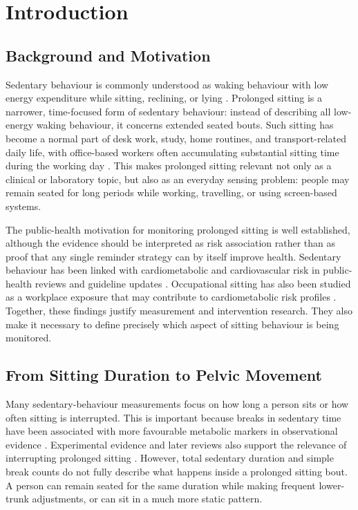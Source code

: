 \chapter{Introduction}\label{ch:introduction}

\section{Background and Motivation}

Sedentary behaviour is commonly understood as waking behaviour with low energy expenditure while sitting, reclining, or lying \cite{sbrn2017terminology}. Prolonged sitting is a narrower, time-focused form of sedentary behaviour: instead of describing all low-energy waking behaviour, it concerns extended seated bouts. Such sitting has become a normal part of desk work, study, home routines, and transport-related daily life, with office-based workers often accumulating substantial sitting time during the working day \cite{hadgraft2015excessive}. This makes prolonged sitting relevant not only as a clinical or laboratory topic, but also as an everyday sensing problem: people may remain seated for long periods while working, travelling, or using screen-based systems.

The public-health motivation for monitoring prolonged sitting is well established, although the evidence should be interpreted as risk association rather than as proof that any single reminder strategy can by itself improve health. Sedentary behaviour has been linked with cardiometabolic and cardiovascular risk in public-health reviews and guideline updates \cite{katzmarzyk2019sedentary}. Occupational sitting has also been studied as a workplace exposure that may contribute to cardiometabolic risk profiles \cite{reichel2022occupational}. Together, these findings justify measurement and intervention research. They also make it necessary to define precisely which aspect of sitting behaviour is being monitored.

\section{From Sitting Duration to Pelvic Movement}

Many sedentary-behaviour measurements focus on how long a person sits or how often sitting is interrupted. This is important because breaks in sedentary time have been associated with more favourable metabolic markers in observational evidence \cite{healy2008breaks}. Experimental evidence and later reviews also support the relevance of interrupting prolonged sitting \cite{buffey2022_interrupting_sitting_meta}. However, total sedentary duration and simple break counts do not fully describe what happens inside a prolonged sitting bout. A person can remain seated for the same duration while making frequent lower-trunk adjustments, or can sit in a much more static pattern.

